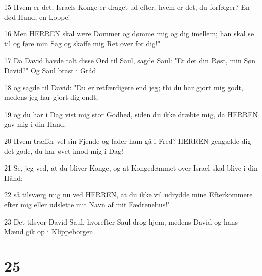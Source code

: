 \par 15 Hvem er det, Israels Konge er draget ud efter, hvem er det, du forfølger? En død Hund, en Loppe!
\par 16 Men HERREN skal være Dommer og dømme mig og dig imellem; han skal se til og føre min Sag og skaffe mig Ret over for dig!"
\par 17 Da David havde talt disse Ord til Saul, sagde Saul: "Er det din Røst, min Søn David?" Og Saul brast i Gråd
\par 18 og sagde til David: "Du er retfærdigere end jeg; thi du har gjort mig godt, medens jeg har gjort dig ondt,
\par 19 og du har i Dag vist mig stor Godhed, siden du ikke dræbte mig, da HERREN gav mig i din Hånd.
\par 20 Hvem træffer vel sin Fjende og lader ham gå i Fred? HERREN gengælde dig det gode, du har øvet imod mig i Dag!
\par 21 Se, jeg ved, at du bliver Konge, og at Kongedømmet over Israel skal blive i din Hånd;
\par 22 så tilsværg mig nu ved HERREN, at du ikke vil udrydde mine Efterkommere efter mig eller udslette mit Navn af mit Fædrenehus!"
\par 23 Det tilsvor David Saul, hvorefter Saul drog hjem, medens David og hans Mænd gik op i Klippeborgen.

\chapter{25}

